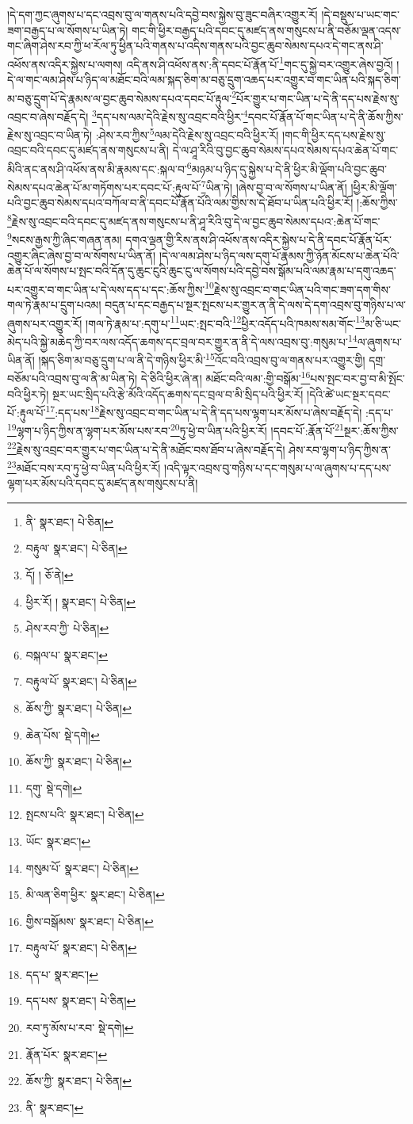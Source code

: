།དེ་དག་ཀྱང་ཞུགས་པ་དང་འབྲས་བུ་ལ་གནས་པའི་དབྱེ་བས་སྐྱེས་བུ་ཟུང་བཞིར་འགྱུར་རོ། །དེ་བསྡུས་པ་ཡང་གང་ཟག་བརྒྱད་པ་ལ་སོགས་པ་ཡིན་ཏེ། གང་གི་ཕྱིར་བརྒྱད་པའི་དབང་དུ་མཛད་ནས་གསུངས་པ་ནི་བཅོམ་ལྡན་འདས་གང་ཞིག་ཤེས་རབ་ཀྱི་ཕ་རོལ་ཏུ་ཕྱིན་པའི་གནས་པ་འདིས་གནས་པའི་བྱང་ཆུབ་སེམས་དཔའ་དེ་གང་ནས་ཤི་འཕོས་ནས་འདིར་སྐྱེས་པ་ལགས། འདི་ནས་ཤི་འཕོས་ནས་:ནི་དབང་པོ་རྣོན་པོ་\footnote{ནི་  སྣར་ཐང་།  པེ་ཅིན། }གང་དུ་སྐྱེ་བར་འགྱུར་ཞེས་བྱའོ། །
དེ་ལ་གང་ལམ་ཤེས་པ་ཉིད་ལ་མཐོང་བའི་ལམ་སྐད་ཅིག་མ་བཅུ་དྲུག་འཆད་པར་འགྱུར་བ་གང་ཡིན་པའི་སྐད་ཅིག་མ་བཅུ་དྲུག་པོ་དེ་རྣམས་ལ་བྱང་ཆུབ་སེམས་དཔའ་དབང་པོ་རྟུལ་\footnote{བརྟུལ་  སྣར་ཐང་།  པེ་ཅིན། }པོར་གྱུར་པ་གང་ཡིན་པ་དེ་ནི་དད་པས་རྗེས་སུ་འབྲང་བ་ཞེས་བརྗོད་དེ། \footnote{དོ། །   ཅོ་ནེ། }དད་པས་ལམ་དེའི་རྗེས་སུ་འབྲང་བའི་ཕྱིར་\footnote{ཕྱིར་རོ། །  སྣར་ཐང་།  པེ་ཅིན། }དབང་པོ་རྣོན་པོ་གང་ཡིན་པ་དེ་ནི་ཆོས་ཀྱིས་རྗེས་སུ་འབྲང་བ་ཡིན་ཏེ། :ཤེས་རབ་ཀྱིས་\footnote{ཤེས་རབ་ཀྱི་  པེ་ཅིན། }ལམ་དེའི་རྗེས་སུ་འབྲང་བའི་ཕྱིར་རོ། །གང་གི་ཕྱིར་དད་པས་རྗེས་སུ་འབྲང་བའི་དབང་དུ་མཛད་ནས་གསུངས་པ་ནི། དེ་ལ་ཤཱ་རིའི་བུ་བྱང་ཆུབ་སེམས་དཔའ་སེམས་དཔའ་ཆེན་པོ་གང་མིའི་ནང་ནས་ཤི་འཕོས་ནས་མི་རྣམས་དང་:སྐལ་བ་\footnote{བསྐལ་པ་  སྣར་ཐང་། }མཉམ་པ་ཉིད་དུ་སྐྱེས་པ་དེ་ནི་ཕྱིར་མི་ལྡོག་པའི་བྱང་ཆུབ་སེམས་དཔའ་ཆེན་པོ་མ་གཏོགས་པར་དབང་པོ་:རྟུལ་པོ་\footnote{བརྟུལ་པོ་  སྣར་ཐང་།  པེ་ཅིན། }ཡིན་ཏེ། །ཞེས་བྱ་བ་ལ་སོགས་པ་ཡིན་ནོ། །ཕྱིར་མི་ལྡོག་པའི་བྱང་ཆུབ་སེམས་དཔའ་བཀོལ་བ་ནི་དབང་པོ་རྣོན་པོའི་ལམ་གྱིས་ས་དེ་ཐོབ་པ་ཡིན་པའི་ཕྱིར་རོ། །:ཆོས་ཀྱིས་\footnote{ཆོས་ཀྱི་  སྣར་ཐང་།  པེ་ཅིན། }རྗེས་སུ་འབྲང་བའི་དབང་དུ་མཛད་ནས་གསུངས་པ་ནི་ཤཱ་རིའི་བུ་དེ་ལ་བྱང་ཆུབ་སེམས་དཔའ་:ཆེན་པོ་གང་\footnote{ཆེན་པོས་  སྡེ་དགེ། }སངས་རྒྱས་ཀྱི་ཞིང་གཞན་ནམ། དགའ་ལྡན་གྱི་རིས་ནས་ཤི་འཕོས་ནས་འདིར་སྐྱེས་པ་དེ་ནི་དབང་པོ་རྣོན་པོར་འགྱུར་ཞིང་ཞེས་བྱ་བ་ལ་སོགས་པ་ཡིན་ནོ། །དེ་ལ་ལམ་ཤེས་པ་ཉིད་ལས་དགུ་པོ་རྣམས་ཀྱི་ཉོན་མོངས་པ་ཆེན་པོའི་ཆེན་པོ་ལ་སོགས་པ་སྤང་བའི་དོན་དུ་ཆུང་ངུའི་ཆུང་ངུ་ལ་སོགས་པའི་དབྱེ་བས་སྒོམ་པའི་ལམ་རྣམ་པ་དགུ་འཆད་པར་འགྱུར་བ་གང་ཡིན་པ་དེ་ལས་དད་པ་དང་:ཆོས་ཀྱིས་\footnote{ཆོས་ཀྱི་  སྣར་ཐང་།  པེ་ཅིན། }རྗེས་སུ་འབྲང་བ་གང་ཡིན་པའི་གང་ཟག་དག་གིས་གལ་ཏེ་རྣམ་པ་དྲུག་པའམ། བདུན་པ་དང་བརྒྱད་པ་སྔར་སྤངས་པར་གྱུར་ན་ནི་དེ་ལས་དེ་དག་འབྲས་བུ་གཉིས་པ་ལ་ཞུགས་པར་འགྱུར་རོ། །གལ་ཏེ་རྣམ་པ་:དགུ་པ་\footnote{དགུ་  སྡེ་དགེ། }ཡང་:སྤང་བའི་\footnote{སྤངས་པའི་  སྣར་ཐང་།  པེ་ཅིན། }ཕྱིར་འདོད་པའི་ཁམས་སམ་གོང་\footnote{ཡོང་  སྣར་ཐང་། }མ་ཅི་ཡང་མེད་པའི་སྐྱེ་མཆེད་ཀྱི་བར་ལས་འདོད་ཆགས་དང་བྲལ་བར་གྱུར་ན་ནི་དེ་ལས་འབྲས་བུ་:གསུམ་པ་\footnote{གསུམ་པོ་  སྣར་ཐང་།  པེ་ཅིན། }ལ་ཞུགས་པ་ཡིན་ནོ། །སྐད་ཅིག་མ་བཅུ་དྲུག་པ་ལ་ནི་དེ་གཉིས་ཕྱིར་མི་\footnote{མི་ལན་ཅིག་ཕྱིར་  སྣར་ཐང་།  པེ་ཅིན། }འོང་བའི་འབྲས་བུ་ལ་གནས་པར་འགྱུར་གྱི། དགྲ་བཅོམ་པའི་འབྲས་བུ་ལ་ནི་མ་ཡིན་ཏེ། དེ་ཅིའི་ཕྱིར་ཞེ་ན། མཐོང་བའི་ལམ་:གྱི་བསྒོམ་\footnote{གྱིས་བསྒོམས་  སྣར་ཐང་།  པེ་ཅིན། }པས་སྤང་བར་བྱ་བ་མི་སྤོང་བའི་ཕྱིར་ཏེ། སྔར་ཡང་སྲིད་པའི་རྩེ་མོའི་འདོད་ཆགས་དང་བྲལ་བ་མི་སྲིད་པའི་ཕྱིར་རོ། །དེའི་ཚེ་ཡང་སྔར་དབང་པོ་:རྟུལ་པོ་\footnote{བརྟུལ་པོ་  སྣར་ཐང་།  པེ་ཅིན། }:དད་པས་\footnote{དད་པ་  སྣར་ཐང་། }རྗེས་སུ་འབྲང་བ་གང་ཡིན་པ་དེ་ནི་དད་པས་ལྷག་པར་མོས་པ་ཞེས་བརྗོད་དེ། :དད་པ་\footnote{དད་པས་  སྣར་ཐང་།  པེ་ཅིན། }ལྷག་པ་ཉིད་ཀྱིས་ན་ལྷག་པར་མོས་པས་རབ་\footnote{རབ་ཏུ་མོས་པ་རབ་  སྡེ་དགེ། }ཏུ་ཕྱེ་བ་ཡིན་པའི་ཕྱིར་རོ། །དབང་པོ་:རྣོན་པོ་\footnote{རྣོན་པོར་  སྣར་ཐང་། }སྔར་:ཆོས་ཀྱིས་\footnote{ཆོས་ཀྱི་  སྣར་ཐང་།  པེ་ཅིན། }རྗེས་སུ་འབྲང་བར་གྱུར་པ་གང་ཡིན་པ་དེ་ནི་མཐོང་བས་ཐོབ་པ་ཞེས་བརྗོད་དེ། ཤེས་རབ་ལྷག་པ་ཉིད་ཀྱིས་ན་\footnote{ནི་  སྣར་ཐང་། }མཐོང་བས་རབ་ཏུ་ཕྱེ་བ་ཡིན་པའི་ཕྱིར་རོ། །འདི་ལྟར་འབྲས་བུ་གཉིས་པ་དང་གསུམ་པ་ལ་ཞུགས་པ་དད་པས་ལྷག་པར་མོས་པའི་དབང་དུ་མཛད་ནས་གསུངས་པ་ནི། 